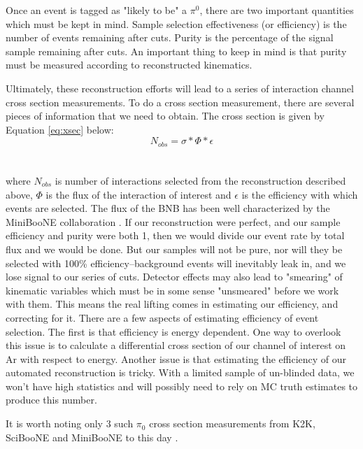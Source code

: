 \documentclass[12pt]{article}
\begin{document}
\vspace{3 mm} \par Once an event is tagged as "likely to be" a $\pi^0$, there are two important quantities which must be kept in mind. Sample selection effectiveness (or efficiency) is the number of events remaining after cuts. Purity is the percentage of the signal sample remaining after cuts. An important thing to keep in mind is that purity must be measured according to reconstructed kinematics. 
\par Ultimately, these reconstruction efforts will lead to a series of interaction channel cross section measurements.  To do a cross section measurement, there are several pieces of information that we need to obtain. The cross section is given by Equation \ref{eq:xsec} below:
\begin{equation} \label{eq:xsec}
 N_{obs} = \sigma * \Phi * \epsilon 	
\end{equation}
\\ \\ where $N_{obs}$ is number of interactions selected from the reconstruction described above, $\Phi$ is the flux of the interaction of interest and $\epsilon$ is the efficiency with which events are selected.  The flux of the BNB has been well characterized by the MiniBooNE collaboration \cite{miniboone}. If our reconstruction were perfect, and our sample efficiency and purity were both 1, then we would divide our event rate by total flux and we would be done. But our samples will not be pure, nor will they be selected with 100\% efficiency--background events will inevitably leak in, and we lose signal to our series of cuts. Detector effects may also lead to "smearing" of kinematic variables which must be in some sense "unsmeared" before we work with them.  This means the real lifting comes in estimating our efficiency, and correcting for it. There are a few aspects of estimating efficiency of event selection.  The first is that efficiency is energy dependent.  One way to overlook this issue is to calculate a differential cross section of our channel of interest on Ar with respect to energy.  Another issue is that estimating the efficiency of our automated reconstruction is tricky.  With a limited sample of un-blinded data, we won't have high statistics and will possibly need to rely on MC truth estimates to produce this number.     
\par \vspace{3 mm}It is worth noting only 3 such $\pi_0$ cross section measurements from K2K, SciBooNE and MiniBooNE to this day \cite{k2k}\cite{sciboone}\cite{anderson}. 
\end{document}
